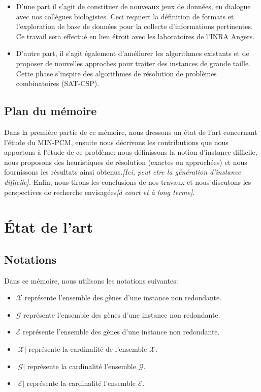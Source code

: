 \documentclass[a4paper,10pt]{article}
\begin{document}
\begin{itemize}
\item D'une part il s'agit de constituer de nouveaux jeux de données, en dialogue avec nos collègues
biologistes. Ceci requiert la définition de formats et l'exploration de base de données pour la collecte
d'informations pertinentes. Ce travail sera effectué en lien étroit avec les laboratoires de l'INRA
Angers.
\item D'autre part, il s'agit également d'améliorer les algorithmes existants et de proposer de nouvelles
approches pour traiter des instances de grande taille. Cette phase s'inspire des algorithmes de
résolution de problèmes combinatoires (SAT-CSP).
\end{itemize}

\subsection*{Plan du mémoire}
Dans la première partie de ce mémoire, nous dressons un état de l'art concernant l'étude du MIN-PCM, ensuite nous décrivons les contributions que nous apportons à l'étude de ce problème: nous définissons la notion d'instance difficile, nous proposons des heuristiques de résolution (exactes ou approchées) et nous fournissons les résultats ainsi obtenus.\textit{[Ici, peut etre la génération d'instance difficile].} Enfin, nous tirons les conclusions de nos travaux et nous discutons les perspectives de recherche envisagées\textit{[à court et à long terme]}.

\newpage
\tableofcontents
\newpage

\section{État de l'art}

\subsection{Notations}
Dans ce mémoire, nous utilisons les notations suivantes:
\begin{itemize}
\item $\mathcal{X}$ représente l'ensemble des gènes d'une instance non redondante.
\item $\mathcal{G}$ représente l'ensemble des gènes d'une instance non redondante.
\item $\mathcal{E}$ représente l'ensemble des gènes d'une instance non redondante.
\item $|\mathcal{X}|$ représente la cardinalité de l'ensemble $\mathcal{X}$.
\item $|\mathcal{G}|$ représente la cardinalité l'ensemble $\mathcal{G}$.
\item $|\mathcal{E}|$ représente la cardinalité l'ensemble $\mathcal{E}$.
\end{itemize}
\end{document}
